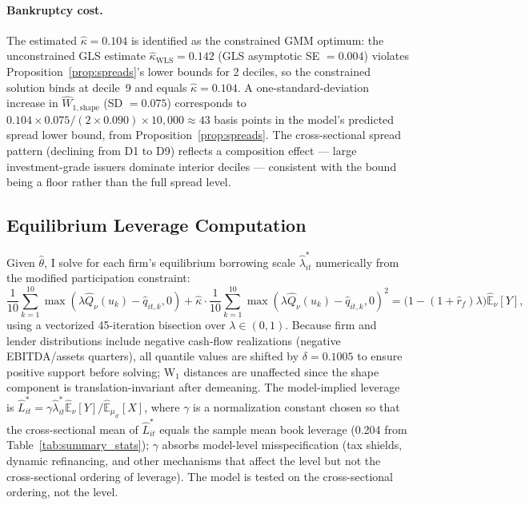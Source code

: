 \paragraph{Bankruptcy cost.}
The estimated $\hat{\kappa} = 0.104$ is identified as the constrained GMM optimum: the unconstrained GLS estimate $\hat{\kappa}_{\text{WLS}} = 0.142$ (GLS asymptotic SE $= 0.004$) violates Proposition~\ref{prop:spreads}'s lower bounds for 2 deciles, so the constrained solution binds at decile~9 and equals $\hat{\kappa} = 0.104$. A one-standard-deviation increase in $\widehat{W}_{1,\text{shape}}$ (SD $= 0.075$) corresponds to $0.104 \times 0.075 / (2 \times 0.090) \times 10{,}000 \approx 43$ basis points in the model's predicted spread lower bound, from Proposition~\ref{prop:spreads}. The cross-sectional spread pattern (declining from D1 to D9) reflects a composition effect — large investment-grade issuers dominate interior deciles — consistent with the bound being a floor rather than the full spread level.

\subsection{Equilibrium Leverage Computation}

Given $\hat{\theta}$, I solve for each firm's equilibrium borrowing scale $\hat{\lambda}_{it}^*$ numerically from the modified participation constraint:
\begin{equation}
  \frac{1}{10}\sum_{k=1}^{10}\max(\lambda\hat{Q}_\nu(u_k) - \hat{q}_{it,k},0)
  + \hat{\kappa}\cdot\frac{1}{10}\sum_{k=1}^{10}\max(\lambda\hat{Q}_\nu(u_k) - \hat{q}_{it,k},0)^2
  = \bigl(1-(1+\hat{r}_f)\lambda\bigr)\hat{\mathbb{E}}_\nu[Y],
  \label{eq:pc_numerical}
\end{equation}
using a vectorized 45-iteration bisection over $\lambda \in (0,1)$. Because firm and lender distributions include negative cash-flow realizations (negative EBITDA/assets quarters), all quantile values are shifted by $\delta = 0.1005$ to ensure positive support before solving; W$_1$ distances are unaffected since the shape component is translation-invariant after demeaning. The model-implied leverage is $\hat{L}_{it}^* = \gamma \hat{\lambda}_{it}^* \hat{\mathbb{E}}_\nu[Y] / \hat{\mathbb{E}}_{\mu_{it}}[X]$, where $\gamma$ is a normalization constant chosen so that the cross-sectional mean of $\hat{L}_{it}^*$ equals the sample mean book leverage (0.204 from Table~\ref{tab:summary_stats}); $\gamma$ absorbs model-level misspecification (tax shields, dynamic refinancing, and other mechanisms that affect the level but not the cross-sectional ordering of leverage). The model is tested on the cross-sectional ordering, not the level.

